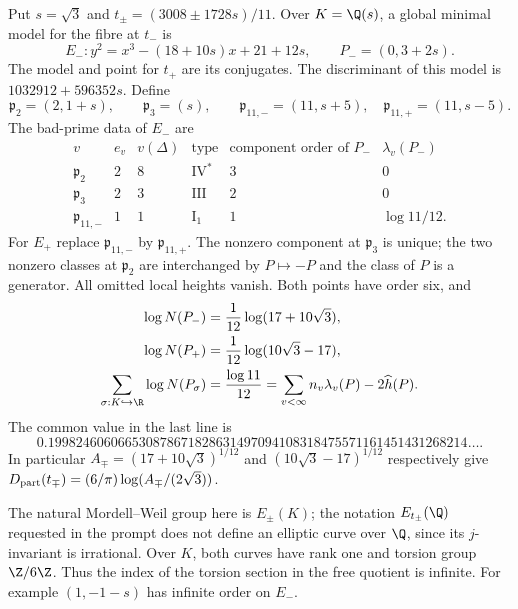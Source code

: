 \begin{proposition}\label{ari:C.6.T2}
Put $s=\sqrt3$ and
$t_\pm=(3008\pm1728s)/11$. Over $K=\Q(s)$, a global minimal
model for the fibre at $t_-$ is
\[
 E_-:y^2=x^3-(18+10s)x+21+12s,\qquad P_-=(0,3+2s).
\]
The model and point for $t_+$ are its conjugates. The
discriminant of this model is $1032912+596352s$. Define
\[
 \mathfrak p_2=(2,1+s),\qquad\mathfrak p_3=(s),\qquad
 \mathfrak p_{11,-}=(11,s+5),\quad
 \mathfrak p_{11,+}=(11,s-5).
\]
The bad-prime data of $E_-$ are
\[
\begin{array}{c|c|c|c|c|c}
v&e_v&v(\Delta)&\text{type}&\text{component order of }P_-&\lambda_v(P_-)\\\hline
\mathfrak p_2&2&8&\mathrm{IV}^*&3&0\\
\mathfrak p_3&2&3&\mathrm{III}&2&0\\
\mathfrak p_{11,-}&1&1&\mathrm I_1&1&\log11/12.
\end{array}
\]
For $E_+$ replace $\mathfrak p_{11,-}$ by
$\mathfrak p_{11,+}$. The nonzero component at
$\mathfrak p_3$ is unique; the two nonzero classes at
$\mathfrak p_2$ are interchanged by $P\mapsto-P$ and the
class of $P$ is a generator. All omitted local heights vanish.
Both points have order six, and
\begin{align*}
 \log N(P_-)&=\frac1{12}\log(17+10\sqrt3),\\
 \log N(P_+)&=\frac1{12}\log(10\sqrt3-17),\\
 \sum_{\sigma:K\hookrightarrow\R}\log N(P_\sigma)
 &=\frac{\log11}{12}
 =\sum_{v<\infty}n_v\lambda_v(P)-2\widehat h(P).
\end{align*}
The common value in the last line is
\[
 0.199824606066530878671828631497094108318475571161451431268214\ldots.
\]
In particular $A_\mp=(17+10\sqrt3)^{1/12}$ and
$(10\sqrt3-17)^{1/12}$ respectively give
$D_{\rm part}(t_\mp)=(6/\pi)\log(A_\mp/(2\sqrt3))$.

The natural Mordell--Weil group here is $E_\pm(K)$; the
notation $E_{t_\pm}(\Q)$ requested in the prompt does not
define an elliptic curve over $\Q$, since its $j$-invariant
is irrational. Over $K$, both curves have rank one and torsion
group $\Z/6\Z$. Thus the index of the torsion section in the
free quotient is infinite. For example $(1,-1-s)$ has infinite
order on $E_-$.
\end{proposition}
